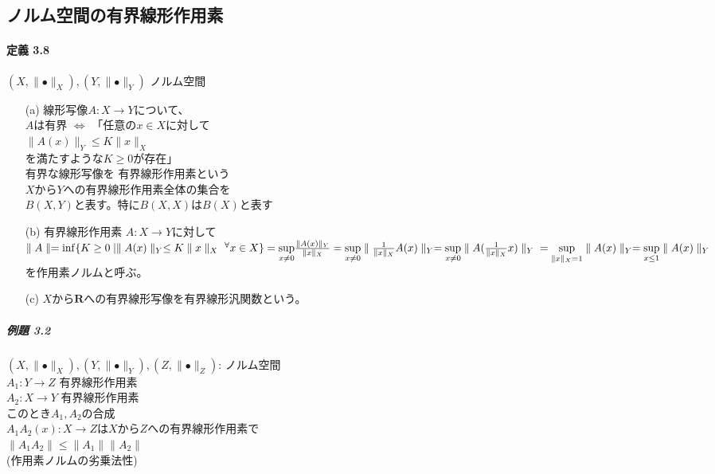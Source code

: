 \documentclass[12pt,a4paper]{article}
\begin{document}
  \subsection{ノルム空間の有界線形作用素}
    \paragraph{定義 3.8}
      $(X, \parallel \bullet\parallel_X), (Y, \parallel\bullet\parallel_Y)$ ノルム空間 \\
      \begin{itemize}
        \item[(a)] 線形写像$A : X \rightarrow Y$について、 \\
          $A$は有界 $\Leftrightarrow$ 「任意の$x \in X$に対して \\
            $\parallel A(x) \parallel_Y \leq K \parallel x \parallel_X$ \\
          を満たすような$K \geq 0$が存在」 \\
          有界な線形写像を 有界線形作用素という \\
          $X$から$Y$への有界線形作用素全体の集合を \\
          $B(X, Y)$と表す。特に$B(X, X)$は$B(X)$と表す
        \item[(b)] 有界線形作用素 $A : X \rightarrow Y$に対して \\
          $\parallel A \parallel = \inf \lbrace K \geq 0 \mid \parallel A(x) \parallel_Y \leq K \parallel x \parallel_X \ {}^\forall x \in X \rbrace \\
          = \underset{x \neq 0}{\sup} \frac{\parallel A(x) \parallel_Y}{\parallel x \parallel_X}
          = \underset{x \neq 0}{\sup}\parallel \frac{1}{\parallel x \parallel_X} A(x) \parallel_Y = \underset{x \neq 0}{\sup}\parallel A (\frac{1}{\parallel x \parallel_X} x) \parallel_Y \\
          = \underset{\parallel x \parallel_X = 1}{\sup} \parallel A(x) \parallel_Y = \underset{x \leq 1}{\sup} \parallel A (x) \parallel_Y$ \\
          を作用素ノルムと呼ぶ。
        \item[(c)] $X$から$\mathbf{R}$への有界線形写像を有界線形汎関数という。
      \end{itemize}
    \subparagraph{例題 3.2}
      $(X, \parallel \bullet \parallel_X), (Y, \parallel \bullet \parallel_Y), (Z, \parallel \bullet \parallel_Z)$: ノルム空間\\
      $A_1 : Y \rightarrow Z$ 有界線形作用素 \\
      $A_2 : X \rightarrow Y$ 有界線形作用素 \\
      このとき$A_1, A_2$の合成 \\
      $A_1 A_2 (x): X \rightarrow Z$は$X$から$Z$への有界線形作用素で \\
      $\parallel A_1 A_2 \parallel \leq \parallel A_1 \parallel \parallel A_2 \parallel $ \\
      (作用素ノルムの劣乗法性)
\end{document}
